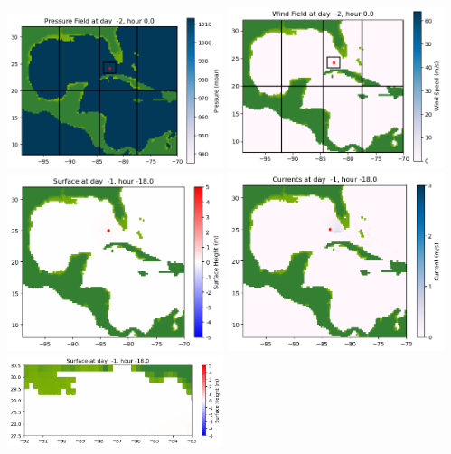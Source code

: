\documentclass[11pt]{article}
\begin{document}
\includegraphics[width=0.475\textwidth]{frame0000fig1006.png}
\vskip 10pt 
\includegraphics[width=0.475\textwidth]{frame0000fig1007.png}
\vskip 10pt 
\includegraphics[width=0.475\textwidth]{frame0001fig1001.png}
\includegraphics[width=0.475\textwidth]{frame0001fig1002.png}
\vskip 10pt 
\includegraphics[width=0.475\textwidth]{frame0001fig1003.png}
\end{document}
